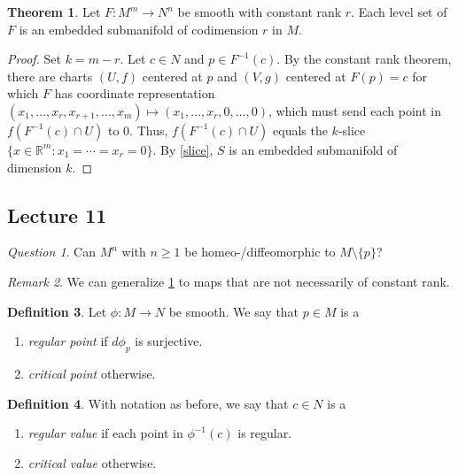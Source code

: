 \documentclass[10pt,letterpaper,cm]{nupset}
\theoremstyle{definition}
\newtheorem{definition}{Definition}[subsection]
\theoremstyle{theorem}
\newtheorem{theorem}[definition]{Theorem}
\theoremstyle{remark}
\newtheorem{remark}[definition]{Remark}
\newtheorem*{question}{Question}
\newcommand{\R}{\mathbb R}
\newcommand{\1}{\mathbf{1}}
\newcommand{\0}{\vec 0}
\begin{document}
\begin{theorem}\label{lset}
Let $F: M^m \to N^n$ be smooth with constant rank $r$. Each level set of $F$ is an embedded submanifold of codimension $r$ in $M$.
\end{theorem}
\begin{proof}
Set $k = m -r$. Let $c \in N$ and $p \in F^{-1}(c)$. By the constant rank theorem, there are charts $(U, f)$ centered at $p$ and $(V, g)$ centered at $F(p) = c$ for which $F$ has coordinate representation $(x_1, \ldots, x_r, x_{r+1}, \ldots, x_m) \mapsto (x_1, \ldots, x_r, 0, \ldots, 0)$, which must send each point in $f(F^{-1}(c) \cap U)$ to $0$.  Thus, $f(F^{-1}(c) \cap U)$ equals the $k$-slice $\{x \in \R^m : x_1 = \cdots = x_r = 0\}$. By \cref{slice}, $S$ is an embedded submanifold of dimension $k$.
\end{proof}

\subsection{Lecture 11}

\begin{question}
Can $M^n$ with $n\geq 1$ be homeo-/diffeomorphic to $M\setminus \{p\}$? 
\end{question}

\begin{remark}
We can generalize \cref{lset} to maps that are not necessarily of constant rank.
\end{remark}

\begin{definition}
Let $\phi : M \to N$ be smooth. We say that $p\in M$ is a
\begin{enumerate}
\item \textit{regular point} if $d\phi_p$ is surjective.
\item  \textit{critical point} otherwise.
\end{enumerate}
\end{definition}

\begin{definition}
With notation as before, we say that $c \in N$ is a
\begin{enumerate}
\item  \textit{regular value} if each point in $\phi^{-1}(c)$ is regular.
\item  \textit{critical value} otherwise.
\end{enumerate}
\end{definition}
\end{document}
